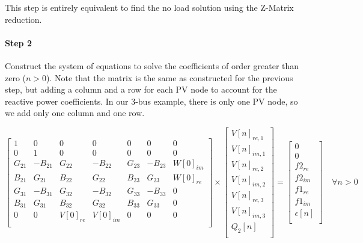 \documentclass[a4paper,twoside,fleqn]{tufte-book}
\begin{document}
This step is entirely equivalent to find the no load solution using the Z-Matrix reduction.

\paragraph{Step 2}

Construct the system of equations to solve the coefficients of order greater than zero ($n>0$). Note that the matrix is the same as constructed for the previous step, but adding a column and a row for each PV node to account for the reactive power coefficients. In our 3-bus example, there is only one PV node, so we add only one column and one row.

\begin{equation}
\begin{bmatrix}
1 & 0 & 0 & 0 & 0 & 0 & 0\\
0 & 1 & 0 & 0 & 0 & 0 & 0\\
G_{21} & -B_{21} & G_{22} & -B_{22} & G_{23} & -B_{23} & W[0]_{im}\\
B_{21} & G_{21}  & B_{22} & G_{22}  & B_{23} & G_{23} & W[0]_{re}\\
G_{31} & -B_{31} & G_{32} & -B_{32} & G_{33} & -B_{33} & 0\\
B_{31} & G_{31}  & B_{32} & G_{32}  & B_{33} & G_{33} & 0\\
0 & 0 & V[0]_{re} & V[0]_{im} & 0 & 0 & 0\\
\end{bmatrix}
\times
\begin{bmatrix}
V[n]_{re, 1}\\
V[n]_{im, 1}\\
V[n]_{re, 2}\\
V[n]_{im, 2}\\
V[n]_{re, 3}\\
V[n]_{im, 3}\\
Q_2[n]\\
\end{bmatrix}
=
\begin{bmatrix}
0\\
0\\
f2_{re}\\
f2_{im}\\
f1_{re}\\
f1_{im}\\
\epsilon[n]\\
\end{bmatrix}
\quad \forall n > 0
\label{lin_sys_2}
\end{equation}
\end{document}
